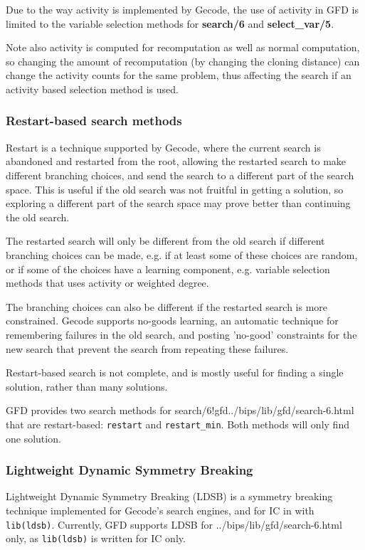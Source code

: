 Due to the way activity is implemented by Gecode, the use of activity in GFD 
is limited to the variable selection methods for {\bf search/6} and 
{\bf select_var/5}.

Note also activity is computed for recomputation as well as normal computation,
so changing the amount of recomputation (by changing the cloning distance)
can change the activity counts for the same problem, thus affecting the
search if an activity based selection method is used.

\subsubsection{Restart-based search methods\label{restartsearch}}

Restart is a technique supported by Gecode,
where the current search is abandoned and restarted from the root,
allowing the restarted search to make different branching choices,
and send the search to a different part of the search space.
This is useful if the old search was not fruitful in getting
a solution, so exploring a different part of the search space may prove
better than continuing the old search.

The restarted search will only be different from the old search
if different branching choices can be made, e.g. if at least some of these
choices are random, or if some of the choices have a learning component,
e.g. variable selection methods that uses activity or weighted degree.

The branching choices can also be different if the restarted search
is more constrained. Gecode supports no-goods learning, an automatic 
technique for remembering failures in the old search, and posting 
'no-good' constraints for the new search that prevent the search from 
repeating these failures.

Restart-based search is not complete, and is mostly useful for finding a
single solution, rather than many solutions.

GFD provides two search methods for 
{search/6!gfd}{../bips/lib/gfd/search-6.html} that are restart-based:
\texttt{restart} and \texttt{restart_min}. Both methods
will only find one solution.
 
\subsubsection{Lightweight Dynamic Symmetry Breaking}
\label{ldsb}
Lightweight Dynamic Symmetry Breaking (LDSB) is a symmetry breaking 
technique implemented for Gecode's search engines, and for IC in \eclipse
with \texttt{lib(ldsb)}. Currently, GFD supports LDSB for 
{../bips/lib/gfd/search-6.html} only, as \texttt{lib(ldsb)} is written 
for IC only.

